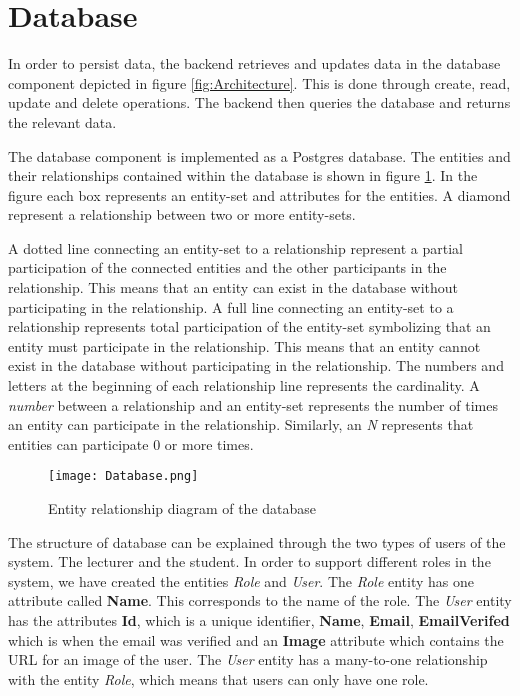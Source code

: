 \section{Database}
In order to persist data, the backend retrieves and updates data in the database component depicted in figure \ref{fig:Architecture}. This is done through create, read, update and delete operations.
The backend then queries the database and returns the relevant data.

The database component is implemented as a Postgres database. The entities and their relationships contained within the database is shown in figure \ref{fig:Database}. In the figure each box represents an entity-set and attributes for the entities. A diamond represent a relationship between two or more entity-sets.

A dotted line connecting an entity-set to a relationship represent a partial participation of the connected entities and the other participants in the relationship. This means that an entity can exist in the database without participating in the relationship.
A full line connecting an entity-set to a relationship represents total participation of the entity-set symbolizing that an entity must participate in the relationship.
This means that an entity cannot exist in the database without participating in the relationship.
The numbers and letters at the beginning of each relationship line represents the cardinality. A \textit{number} between a relationship and an entity-set represents the number of times an entity can participate in the relationship. Similarly, an \textit{N} represents that entities can participate $0$ or more times.

\begin{figure}[H]
	\texttt{[image: Database.png]}
	\centering
	\caption{Entity relationship diagram of the database}
	\label{fig:Database}
\end{figure}

The structure of database can be explained through the two types of users of the system. The lecturer and the student.
In order to support different roles in the system, we have created the entities \textit{Role} and \textit{User}. The \textit{Role} entity has one attribute called \textbf{Name}. This corresponds to the name of the role. The \textit{User} entity has the attributes \textbf{Id}, which is a unique identifier, \textbf{Name}, \textbf{Email}, \textbf{EmailVerifed} which is when the email was verified and an \textbf{Image} attribute which contains the URL for an image of the user. The \textit{User} entity has a many-to-one relationship with the entity \textit{Role}, which means that users can only have one role.


